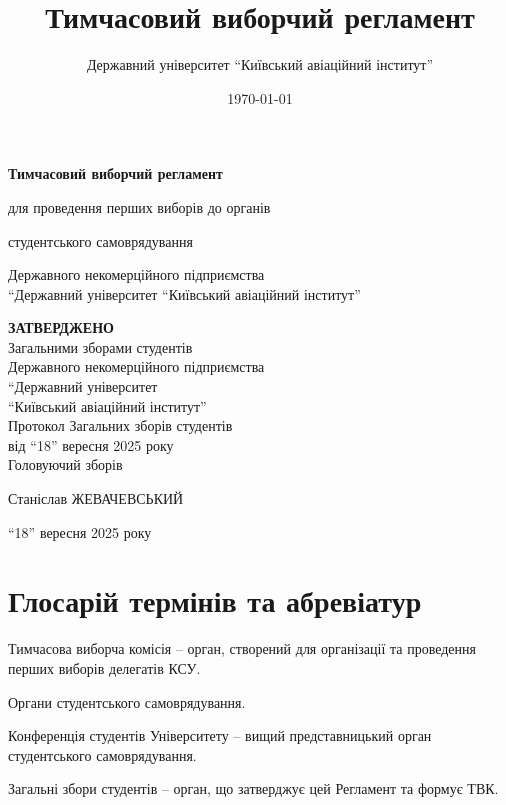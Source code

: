 \documentclass[12pt, a4paper]{article}
\title{Тимчасовий виборчий регламент}
\author{Державний університет ``Київський авіаційний інститут''}
\date{\today} %
\begin{document}
\begin{titlepage}
    \centering
    \vspace*{\fill} %

    {\Huge\bfseries Тимчасовий виборчий регламент}\par %
    \vspace{1em} %
    {\LARGE для проведення перших виборів до органів}\par %
    {\LARGE студентського самоврядування}\par
    \vspace{0.5em} %
    {\large Державного некомерційного підприємства \\ ``Державний університет ``Київський авіаційний інститут''}\par %

    \vspace{4cm}

    \begin{flushright}
    \parbox{0.55\textwidth}{\raggedleft\large
        \textbf{ЗАТВЕРДЖЕНО}\\
        Загальними зборами студентів\\
        Державного некомерційного підприємства\\
        ``Державний університет\\
        ``Київський авіаційний інститут''\\
        Протокол Загальних зборів студентів\\
        від ``18'' вересня 2025 року\\
        Головуючий зборів

        Станіслав ЖЕВАЧЕВСЬКИЙ

        ``18'' вересня 2025 року
    }
    \end{flushright}

    \vspace*{\fill} %
\end{titlepage}

\section*{Глосарій термінів та абревіатур}
\begin{description}[leftmargin=3cm,style=nextline]
    \item[ТВК] Тимчасова виборча комісія -- орган, створений для організації та проведення перших виборів делегатів КСУ.
    \item[ОСС] Органи студентського самоврядування.
    \item[КСУ] Конференція студентів Університету -- вищий представницький орган студентського самоврядування.
    \item[ЗЗС] Загальні збори студентів -- орган, що затверджує цей Регламент та формує ТВК.
\end{description}
\newpage
\end{document}
